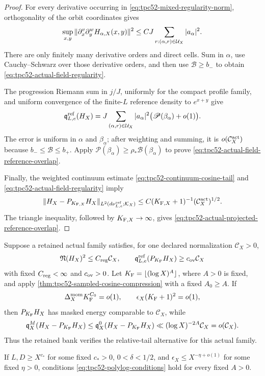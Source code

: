 \begin{proof}
For every derivative occurring in
\eqref{eq:tpc52-mixed-regularity-norm}, orthogonality of the orbit
coordinates gives
\[
 \sup_{x,y}\|\partial_x^v\partial_y^wH_{\alpha,X}(x,y)\|^2
 \le C J\sum_{r:(\alpha,r)\in\mathcal U_X}|a_\alpha|^2.
\]
There are only finitely many derivative orders and direct cells.  Sum in
\(\alpha\), use Cauchy--Schwarz over those derivative orders, and then use
\(\mathscr B\ge b_-\) to obtain
\eqref{eq:tpc52-actual-field-regularity}.

The progression Riemann sum in \(j/J\), uniformly for the compact profile
family, and uniform convergence of the finite-\(L\) reference density to
\(e^{x+y}\) give
\[
 \mathfrak q_{L,e}^{\rm ref}(H_X)
 =J\sum_{(\alpha,r)\in\mathcal U_X}|a_\alpha|^2
   \bigl(\mathscr P(\beta_\alpha)+o(1)\bigr).
\]
The error is uniform in \(\alpha\) and \(\beta_\alpha\); after weighting and summing,
it is \(o(\mathcal C_X^{\rm act})\) because
\(b_-\le\mathscr B\le b_+\).  Apply
\(\mathscr P(\beta_\alpha)\ge\rho_*\mathscr B(\beta_\alpha)\) to prove
\eqref{eq:tpc52-actual-field-reference-overlap}.

Finally, the weighted continuum estimate
\eqref{eq:tpc52-continuum-cosine-tail} and
\eqref{eq:tpc52-actual-field-regularity} imply
\[
 \|H_X-P_{K_{{\rm F},X}}H_X\|_{L^2(d\nu_{L,e}^{\rm ref};\mathcal K_X)}
 \le C(K_{{\rm F},X}+1)^{-1}(\mathcal C_X^{\rm act})^{1/2}.
\]
The triangle inequality, followed by \(K_{{\rm F},X}\to\infty\), gives
\eqref{eq:tpc52-actual-projected-reference-overlap}.
\end{proof}

\begin{corollary}
\label{cor:tpc52-polylog-relative-tail}
Suppose a retained actual family satisfies, for one declared
normalization \(\mathcal C_X>0\),
\begin{equation}
 \mathfrak N(H_X)^2\leq C_{\rm reg}\mathcal C_X,
 \qquad
 \mathfrak q_{L,e}^{\rm ref}(P_{K_{\rm F}}H_X)\geq c_{\rm ov}\mathcal C_X
 \label{eq:tpc52-relative-tail-normalization}
\end{equation}
with fixed \(C_{\rm reg}<\infty\) and \(c_{\rm ov}>0\).  Let
\(K_{\rm F}=\lfloor(\log X)^A\rfloor\), where \(A>0\) is fixed, and apply
\cref{thm:tpc52-sampled-cosine-compression} with a fixed
\(A_0\ge A\).  If
\begin{equation}
 \Delta_X^{\rm mom}K_{\rm F}^{C_0}=o(1),
 \qquad
 \epsilon_X(K_{\rm F}+1)^2=o(1),
 \label{eq:tpc52-polylog-conditions}
\end{equation}
then \(P_{K_{\rm F}}H_X\) has masked energy comparable to
\(\mathcal C_X\), while
\begin{equation}
 \mathfrak q_X^M(H_X-P_{K_{\rm F}}H_X)
 \leq\mathfrak q_X^0(H_X-P_{K_{\rm F}}H_X)
 \ll (\log X)^{-2A}\mathcal C_X=o(\mathcal C_X).
 \label{eq:tpc52-polylog-tail-conclusion}
\end{equation}
Thus the retained bank verifies the relative-tail alternative for this
actual family.

If \(L,D\geq X^{c_*}\) for some fixed \(c_*>0\),
\(0<\delta<1/2\), and \(\epsilon_X\leq X^{-\eta+o(1)}\) for some fixed
\(\eta>0\), conditions \eqref{eq:tpc52-polylog-conditions} hold for
every fixed \(A>0\).
\end{corollary}

